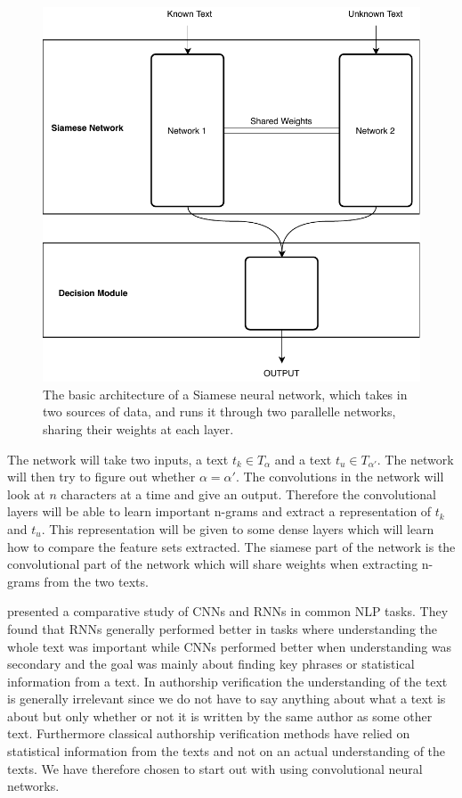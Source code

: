 \begin{figure}
    \centering
    \includegraphics[scale=0.5]{./pictures/method/siamese}
    \caption{The basic architecture of a Siamese neural network, which takes in
        two sources of data, and runs it through two parallelle networks,
        sharing their weights at each layer.}
    \label{fig:siamese_example}
\end{figure}

The network will take two inputs, a text $t_k \in T_\alpha$ and a text $t_u
\in T_{\alpha'}$. The network will then try to figure out whether $\alpha =
\alpha'$. The convolutions in the network will look at $n$ characters at a
time and give an output. Therefore the convolutional layers will be able to
learn important n-grams and extract a representation of $t_k$ and $t_u$. This
representation will be given to some dense layers which will learn how to
compare the feature sets extracted. The siamese part of the network is the
convolutional part of the network which will share weights when extracting
n-grams from the two texts.

\citet{DBLP:journals/corr/0001KYS17} presented a comparative study of
\glspl{CNN} and \glspl{RNN} in common \gls{NLP} tasks. They found that
\glspl{RNN} generally performed better in tasks where understanding the whole
text was important while \glspl{CNN} performed better when understanding was
secondary and the goal was mainly about finding key phrases or statistical
information from a text. In authorship verification the understanding of the
text is generally irrelevant since we do not have to say anything about what a
text is about but only whether or not it is written by the same author as some
other text. Furthermore classical authorship verification methods have relied
on statistical information from the texts and not on an actual understanding of
the texts. We have therefore chosen to start out with using convolutional neural
networks.


